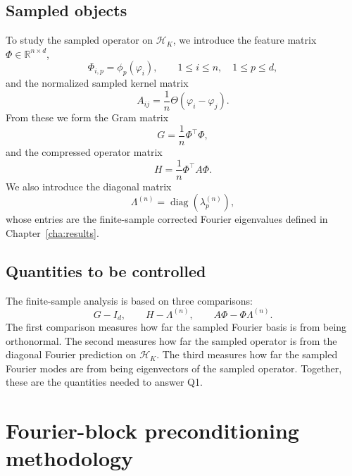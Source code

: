 \subsection{Sampled objects}

To study the sampled operator on \(\mathcal{H}_K\), we introduce the feature matrix
\(\Phi\in\mathbb{R}^{n\times d}\),
\begin{equation}
	\Phi_{i,p}=\phi_p(\varphi_i),
	\qquad
	1\leq i\leq n,\quad 1\leq p\leq d,
	\label{eq:method-feature-matrix}
\end{equation}
and the normalized sampled kernel matrix
\begin{equation}
	A_{ij}=\frac{1}{n}\Theta(\varphi_i-\varphi_j).
	\label{eq:method-empirical-operator}
\end{equation}
From these we form the Gram matrix
\begin{equation}
	G=\frac{1}{n}\Phi^\top\Phi,
	\label{eq:method-gram-matrix}
\end{equation}
and the compressed operator matrix
\begin{equation}
	H=\frac{1}{n}\Phi^\top A\Phi.
	\label{eq:method-compressed-operator}
\end{equation}
We also introduce the diagonal matrix
\begin{equation}
	\Lambda^{(n)}=\operatorname{diag}(\lambda_p^{(n)}),
	\label{eq:method-finite-sample-eigenvalue-matrix}
\end{equation}
whose entries are the finite-sample corrected Fourier eigenvalues defined in
Chapter~\ref{cha:results}.

\subsection{Quantities to be controlled}

The finite-sample analysis is based on three comparisons:
\begin{equation}
	G-I_d,
	\qquad
	H-\Lambda^{(n)},
	\qquad
	A\Phi-\Phi\Lambda^{(n)}.
	\label{eq:method-finite-sample-objects}
\end{equation}
The first comparison measures how far the sampled Fourier basis is from being
orthonormal. The second measures how far the sampled operator is from the
diagonal Fourier prediction on \(\mathcal H_K\). The third measures how far the
sampled Fourier modes are from being eigenvectors of the sampled operator.
Together, these are the quantities needed to answer Q1.

\section{Fourier-block preconditioning methodology}
\label{sec:method-preconditioning}

